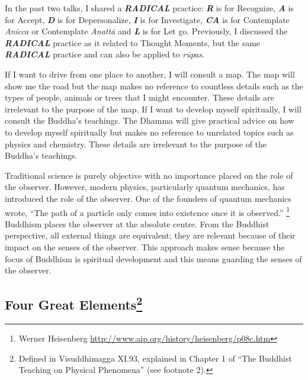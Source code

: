 In the past two talks, I shared a \textbf{\textit{RADICAL}} practice: \textbf{\textit{R}} is for Recognize, \textbf{\textit{A}} is for Accept, \textbf{\textit{D}} is for Depersonalize, \textbf{\textit{I}} is for Investigate, \textbf{\textit{CA}} is for Contemplate \textit{Anicca} or Contemplate \textit{Anattā} and \textit{\textbf{L}} is for Let go. Previously, I discussed the \textbf{\textit{RADICAL}} practice as it related to Thought Moments, but the same \textbf{\textit{RADICAL}} practice and can also be applied to \textit{rūpas}.

If I want to drive from one place to another, I will consult a map. The map will show me the road but the map makes no reference to countless details such as the types of people, animals or trees that I might encounter. These details are irrelevant to the purpose of the map. If I want to develop myself spiritually, I will consult the Buddha’s teachings. The Dhamma will give practical advice on how to develop myself spiritually but makes no reference to unrelated topics such as physics and chemistry. These details are irrelevant to the purpose of the Buddha’s teachings.

Traditional science is purely objective with no importance placed on the role of the observer. However, modern physics, particularly quantum mechanics, has introduced the role of the observer. One of the founders of quantum mechanics wrote, “The path of a particle only comes into existence once it is observed.” \footnote{Werner Heisenberg \url{http://www.aip.org/history/heisenberg/p08c.htm}} Buddhism places the observer at the absolute centre. From the Buddhist perspective, all external things are equivalent; they are relevant because of their impact on the senses of the observer. This approach makes sense because the focus of Buddhism is spiritual development and this means guarding the senses of the observer.

\subsection*{Four Great Elements\footnote{Defined in Visuddhimagga XI.93, explained in Chapter 1 of “The Buddhist Teaching on Physical Phenomena” (see footnote 2).}}

